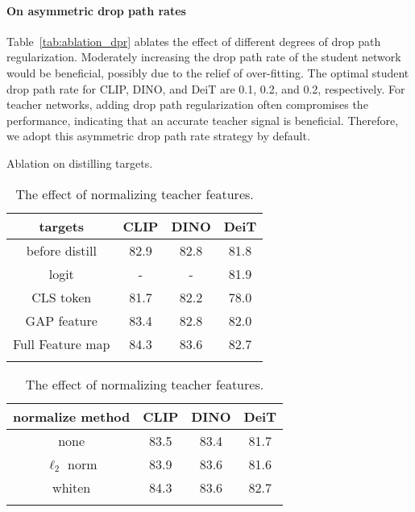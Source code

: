 \documentclass{article}
\begin{document}
\paragraph{On asymmetric drop path rates} Table~\ref{tab:ablation_dpr} ablates the effect of different degrees of drop path regularization. Moderately increasing the drop path rate of the student network would be beneficial, possibly due to the relief of over-fitting. The optimal student drop path rate for CLIP, DINO, and DeiT are 0.1, 0.2, and 0.2, respectively. For teacher networks, adding drop path regularization often compromises the performance, indicating that an accurate teacher signal is beneficial. Therefore, we adopt this asymmetric drop path rate strategy by default.


\begin{table}[t]
    \begin{minipage}{0.49\linewidth}
    \centering
    \addtolength{\tabcolsep}{-1pt}
    \caption{Ablation on distilling targets.}
    \begin{tabular}{c|ccc}
        \Xhline{2\arrayrulewidth}
            targets & CLIP & DINO & DeiT \\
            \hline
            before distill & 82.9 & 82.8 & 81.8 \\
            \hline
            logit & - & - & 81.9 \\
            CLS token & 81.7 & 82.2 &  78.0 \\
            GAP feature & 83.4 & 82.8 &  82.0 \\
            Full Feature map & 84.3 & 83.6 & 82.7 \\
            \Xhline{2\arrayrulewidth}
    \end{tabular}
    \label{tab:ablation_targets}
    
    \vspace{1em}
    
    \addtolength{\tabcolsep}{-1pt}
    \caption{The effect of normalizing teacher features.}
    \begin{tabular}{c|ccc}
        \Xhline{2\arrayrulewidth}
            normalize method & CLIP & DINO & DeiT \\
            \hline
            none & 83.5 & 83.4 & 81.7  \\
            $\ell_2$ norm & 83.9 & 83.6 & 81.6  \\
            whiten & 84.3 & 83.6 & 82.7 \\
            \Xhline{2\arrayrulewidth}
    \end{tabular}
    \label{tab:ablation_normalization}
        

\end{minipage}
\end{table}
\end{document}
